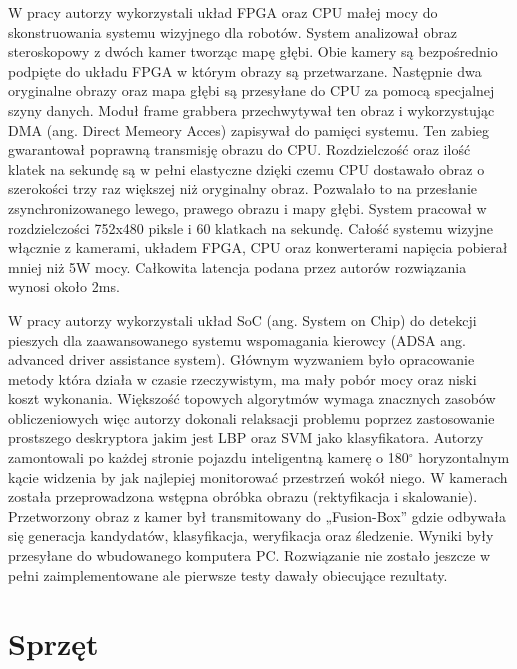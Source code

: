 W pracy \cite{honegger2014real} autorzy wykorzystali układ FPGA oraz CPU małej mocy do skonstruowania systemu wizyjnego dla robotów. System analizował obraz steroskopowy z dwóch kamer tworząc mapę głębi. Obie kamery są bezpośrednio podpięte do układu FPGA w którym obrazy są przetwarzane. Następnie dwa oryginalne obrazy oraz mapa głębi są przesyłane do CPU za pomocą specjalnej szyny danych. Moduł frame grabbera przechwytywał ten obraz i wykorzystując DMA (ang. Direct Memeory Acces) zapisywał do pamięci systemu. Ten zabieg gwarantował poprawną transmisję obrazu do CPU. Rozdzielczość oraz ilość klatek na sekundę są w pełni elastyczne dzięki czemu CPU dostawało obraz o szerokości trzy raz większej niż oryginalny obraz. Pozwalało to na przesłanie zsynchronizowanego lewego, prawego obrazu i mapy głębi. System pracował w rozdzielczości 752x480 piksle i 60 klatkach na sekundę. Całość systemu wizyjne włącznie z kamerami, układem FPGA, CPU oraz konwerterami napięcia pobierał mniej niż 5W mocy. Całkowita latencja podana przez autorów rozwiązania wynosi około 2ms.

W pracy \cite{piao2016real} autorzy wykorzystali układ SoC (ang. System on Chip) do detekcji pieszych dla zaawansowanego systemu wspomagania kierowcy (ADSA ang. advanced driver assistance system). Głównym wyzwaniem było opracowanie metody która działa w czasie rzeczywistym, ma mały pobór mocy oraz niski koszt wykonania. Większość topowych algorytmów  wymaga znacznych zasobów obliczeniowych więc autorzy dokonali relaksacji problemu poprzez zastosowanie prostszego deskryptora jakim jest LBP oraz SVM jako klasyfikatora. Autorzy zamontowali po każdej stronie pojazdu inteligentną kamerę o 180$^\circ$ horyzontalnym kącie widzenia by jak najlepiej monitorować przestrzeń wokół niego. W kamerach została przeprowadzona wstępna obróbka obrazu (rektyfikacja i skalowanie). Przetworzony obraz z kamer był transmitowany do „Fusion-Box” gdzie odbywała się generacja kandydatów, klasyfikacja, weryfikacja oraz śledzenie. Wyniki były przesyłane do wbudowanego komputera PC. Rozwiązanie nie zostało jeszcze w pełni zaimplementowane ale pierwsze testy dawały obiecujące rezultaty.

\section{Sprzęt}
